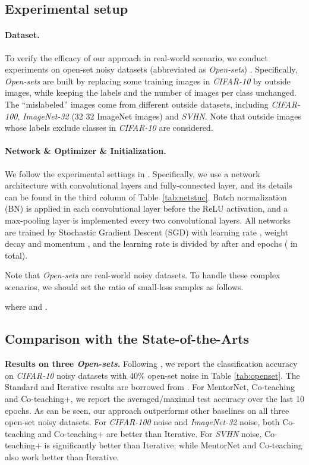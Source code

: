 \documentclass{article}
\begin{document}
\subsection{Experimental setup}\label{sec:setup}

\paragraph{Dataset.} To verify the efficacy of our approach in real-world scenario, we conduct experiments on open-set noisy datasets (abbreviated as \textit{Open-sets}) \cite{wang2018iterative}. Specifically, \textit{Open-sets} are built by replacing some training images in \textit{CIFAR-10} by outside images, while keeping the labels and the number of images per class unchanged. The ``mislabeled'' images come from different outside datasets, including \textit{CIFAR-100}, \textit{ImageNet-32} (32  32 ImageNet images) and \textit{SVHN}. Note that outside images whose labels exclude  classes in \textit{CIFAR-10} are considered.

\paragraph{Network \& Optimizer \& Initialization.} We follow the experimental settings in \cite{wang2018iterative}. Specifically, we use a network architecture with  convolutional layers and  fully-connected layer, and its details can be found in the third column of Table~\ref{tab:netstuc}. Batch normalization (BN) is applied in each convolutional layer before the ReLU activation, and a max-pooling layer is implemented every two convolutional layers. All networks are trained by Stochastic Gradient Descent (SGD) with learning rate , weight decay  and momentum , and the learning rate is divided by  after  and  epochs ( in total).

Note that \textit{Open-sets} are real-world noisy datasets. To handle these complex scenarios, we should set the ratio of small-loss samples  as follows.

where  and .

\subsection{Comparison with the State-of-the-Arts}\label{sec:comp}

\textbf{Results on three \textit{Open-sets}.} Following \cite{wang2018iterative}, we report the classification accuracy on \textit{CIFAR-10} noisy datasets with 40\% open-set noise in Table \ref{tab:openset}. The Standard and Iterative results are borrowed from \cite{wang2018iterative}. For MentorNet, Co-teaching and Co-teaching+, we report the averaged/maximal test accuracy over the last 10 epochs. As can be seen, our approach outperforms other baselines on all three open-set noisy datasets. For \textit{CIFAR-100} noise and \textit{ImageNet-32} noise, both Co-teaching and Co-teaching+ are better than Iterative. For \textit{SVHN} noise, Co-teaching+ is significantly better than Iterative; while MentorNet and Co-teaching also work better than Iterative.
\end{document}
